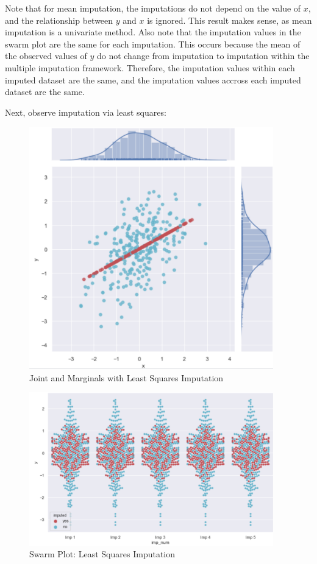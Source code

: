 \documentclass[12pt,oneside]{chicagocapstone}
\begin{document}
Note that for mean imputation, the imputations do not depend on the
value of \(x\), and the relationship between \(y\) and \(x\) is ignored.
This result makes sense, as mean imputation is a univariate method. Also
note that the imputation values in the swarm plot are the same for each
imputation. This occurs because the mean of the observed values of \(y\)
do not change from imputation to imputation within the multiple
imputation framework. Therefore, the imputation values within each
imputed dataset are the same, and the imputation values accross each
imputed dataset are the same.

Next, observe imputation via least squares:
\begin{figure}

{\centering \includegraphics[width=400px]{figure/multi-lm} 

}

\caption{Joint and Marginals with Least Squares Imputation}\label{fig:multi-lm}
\end{figure}
\begin{figure}

{\centering \includegraphics[width=400px]{figure/swarm-lm} 

}

\caption{Swarm Plot: Least Squares Imputation}\label{fig:swarm-lm}
\end{figure}
\end{document}
